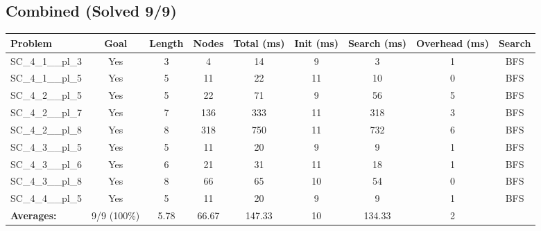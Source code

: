 \documentclass{article}
\begin{document}
\subsection*{Combined (Solved 9/9)}
\begin{tabular}{lcccccccc}
\toprule
Problem & Goal & Length & Nodes & Total (ms) & Init (ms) & Search (ms) & Overhead (ms) & Search \\
\midrule
SC\_4\_1\_\_pl\_3 & Yes & 3 & 4 & 14 & 9 & 3 & 1 & BFS \\
SC\_4\_1\_\_pl\_5 & Yes & 5 & 11 & 22 & 11 & 10 & 0 & BFS \\
SC\_4\_2\_\_pl\_5 & Yes & 5 & 22 & 71 & 9 & 56 & 5 & BFS \\
SC\_4\_2\_\_pl\_7 & Yes & 7 & 136 & 333 & 11 & 318 & 3 & BFS \\
SC\_4\_2\_\_pl\_8 & Yes & 8 & 318 & 750 & 11 & 732 & 6 & BFS \\
SC\_4\_3\_\_pl\_5 & Yes & 5 & 11 & 20 & 9 & 9 & 1 & BFS \\
SC\_4\_3\_\_pl\_6 & Yes & 6 & 21 & 31 & 11 & 18 & 1 & BFS \\
SC\_4\_3\_\_pl\_8 & Yes & 8 & 66 & 65 & 10 & 54 & 0 & BFS \\
SC\_4\_4\_\_pl\_5 & Yes & 5 & 11 & 20 & 9 & 9 & 1 & BFS \\
\textbf{Averages:} & 9/9 (100\%) & 5.78 & 66.67 & 147.33 & 10 & 134.33 & 2 & \\
\bottomrule
\end{tabular}
\\[0.7cm]
\end{document}
